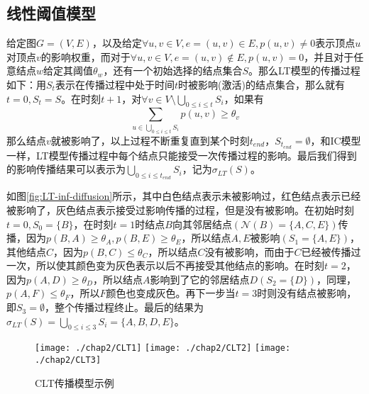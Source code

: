 \subsection{线性阈值模型}
\label{sec:LT-model-desc}
给定图$G=(V, E)$，以及给定$\forall u, v \in V, e=(u, v) \in E, p(u, v) \neq 0$表示顶点$u$对顶点$v$的影响权重，而对于$\forall u, v \in V, e=(u, v) \notin E, p(u, v)=0$，并且对于任意结点$w$给定其阈值$\theta_{w}$，还有一个初始选择的结点集合$S$。那么LT模型的传播过程如下：用$S_{t}$表示在传播过程中处于时间$t$时被影响(激活)的结点集合，那么就有$t=0, S_{t}=S$。在时刻$t+1$，对$\forall v \in V\setminus \bigcup_{0 \leq i \leq t}S_{i}$，如果有
\begin{displaymath} 
	{\sum_{u \in \bigcup_{0 \leq i \leq t}S_{i}}p(u,v) \geq \theta_{v}} 
\end{displaymath}
那么结点$v$就被影响了，以上过程不断重复直到某个时刻$t_{end}$，$S_{t_{end}}=\emptyset$，和IC模型一样，LT模型传播过程中每个结点只能接受一次传播过程的影响。最后我们得到的影响传播结果可以表示为$\bigcup_{0 \leq i \leq t_{end}}S_{i}$，记为$\sigma_{LT}(S)$。


如图\ref{fig:LT-inf-diffusion}所示，其中白色结点表示未被影响过，红色结点表示已经被影响了，灰色结点表示接受过影响传播的过程，但是没有被影响。在初始时刻$t=0,S_{0}=\{B\}$，在时刻$t=1$时结点$B$向其邻居结点$(\mathcal{N}(B)=\{A, C, E\})$传播，因为$p(B,A) \geq \theta_{A}, p(B,E) \geq \theta_{E}$，所以结点$A, E$被影响$(S_{1}=\{A, E\})$，其他结点$C$，因为$p(B,C) \leq \theta_{C}$，所以结点$C$没有被影响，而由于$C$已经被传播过一次，所以使其颜色变为灰色表示以后不再接受其他结点的影响。在时刻$t=2$，因为$p(A,D) \geq \theta_{D}$，所以结点$A$影响到了它的邻居结点$D(S_{2}=\{D\})$，同理，$p(A, F) \leq \theta_{F}$，所以$F$颜色也变成灰色。再下一步当$t=3$时则没有结点被影响，即$S_{3}=\emptyset$，整个传播过程终止。最后的结果为$\sigma_{LT}(S)=\bigcup_{0 \leq i \leq 3}S_{i}=\{A, B, D, E\}$。


\begin{figure}[H]
\centering%
	{\texttt{[image: ./chap2/CLT1]}}
	\hspace{1mm}%
	{\texttt{[image: ./chap2/CLT2]}}
	\hspace{1mm}%
	{\texttt{[image: ./chap2/CLT3]}}
	\caption{CLT传播模型示例}
	\label{fig:CLT-inf-diffusion}
\end{figure}


